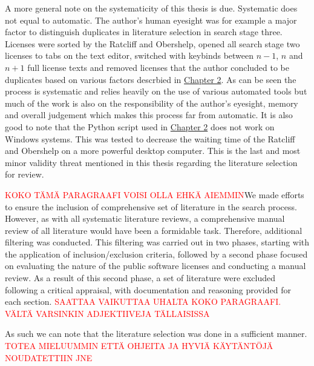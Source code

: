 A more general note on the systematicity of this thesis is due. Systematic does not equal to automatic. The author's human eyesight was for example a major factor to distinguish duplicates in literature selection in search stage three. Licenses were sorted by the Ratcliff and Obershelp, opened all search stage two licenses to tabs on the text editor, switched with keybinds between $n - 1$, $n$ and $n + 1$ full license texts and removed licenses that the author concluded to be duplicates based on various factors descrbied in \hyperref[methods]{Chapter 2}. As can be seen the process is systematic and relies heavily on the use of various automated tools but much of the work is also on the responsibility of the author's eyesight, memory and overall judgement which makes this process far from automatic. It is also good to note that the Python script used in \hyperref[methods]{Chapter 2} does not work on Windows systems. This was tested to decrease the waiting time of the Ratcliff and Obershelp on a more powerful desktop computer. This is the last and most minor validity threat mentioned in this thesis regarding the literature selection for review.

\textcolor{red}{KOKO TÄMÄ PARAGRAAFI VOISI OLLA EHKÄ AIEMMIN}We made efforts to ensure the inclusion of comprehensive set of literature in the search process. However, as with all systematic literature reviews, a comprehensive manual review of all literature would have been a formidable task. Therefore, additional filtering was conducted. This filtering was carried out in two phases, starting with the application of inclusion/exclusion criteria, followed by a second phase focused on evaluating the nature of the public software licenses and conducting a manual review. As a result of this second phase, a set of literature were excluded following a critical appraisal, with documentation and reasoning provided for each section. \textcolor{red}{SAATTAA VAIKUTTAA UHALTA KOKO PARAGRAAFI. VÄLTÄ VARSINKIN ADJEKTIIVEJA TÄLLAISISSA}

As such we can note that the literature selection was done in a sufficient manner. \textcolor{red}{TOTEA MIELUUMMIN ETTÄ OHJEITA JA HYVIÄ KÄYTÄNTÖJÄ NOUDATETTIIN JNE}

